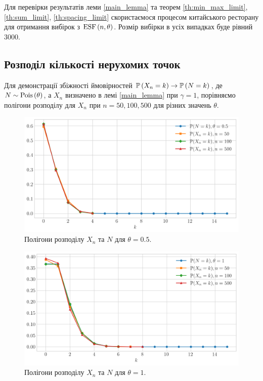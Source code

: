 Для перевірки результатів леми \ref{main_lemma} та теорем
\ref{th:min_max_limit}, \ref{th:sum_limit}, \ref{th:spacing_limit}
скористаємося процесом китайського ресторану для отримання вибірок
з $\ESF{n, \theta}$. Розмір вибірки в усіх випадках буде рівний 3000.

\subsection{Розподіл кількості нерухомих точок}
Для демонстрації збіжності ймовірностей
$\P{X_n = k} \to \P{N = k}$, де $N \sim \Poiss{\theta}$,
а $X_n$ визначено в лемі \ref{main_lemma} при $\gamma = 1$,
порівняємо полігони розподілу для $X_n$ при $n = 50, 100, 500$ для
різних значень $\theta$.
\begin{figure}[H]
    \centering
    \includegraphics[scale=0.6]{plots/fp_prob_theta_0.5.png}
    \caption{Полігони розподілу $X_n$ та $N$ для $\theta = 0.5$.}
\end{figure}

\begin{figure}[H]
    \centering
    \includegraphics[scale=0.6]{plots/fp_prob_theta_1.png}
    \caption{Полігони розподілу $X_n$ та $N$ для $\theta = 1$.}
\end{figure}

